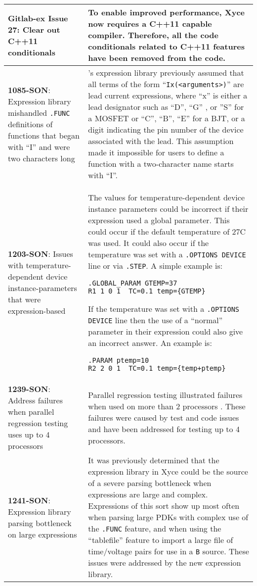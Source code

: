 {\begin{longtable}[h] {>{\raggedright\small}m{2in}|>{\raggedright\let\\\tabularnewline\small}m{3.5in}}
\textbf{Gitlab-ex Issue 27}:  Clear out C++11 conditionals&
To enable improved performance, Xyce now requires a C++11 capable compiler.
Therefore, all the code conditionals related to C++11 features have been
removed from the code. 
\\ \hline

\textbf{1085-SON}: Expression library mishandled \texttt{.FUNC} 
definitions of functions that began with ``I'' and were two characters long &
\Xyce{}'s expression library previously assumed that all terms of the form
``\texttt{Ix(<arguments>)}'' are lead current expressions, where ``x'' is
either a lead designator such as ``D'', ``G'' , or ''S'' for a MOSFET
or ``C'', ``B'', ``E'' for a BJT, or a digit indicating the pin number
of the device associated with the lead.  This assumption made it
impossible for users to define a function with a two-character name
starts with ``I''.  
\\ \hline

\textbf{1203-SON}: Issues with temperature-dependent device
instance-parameters that were expression-based & The values for
temperature-dependent device instance parameters could be incorrect
if their expression used a global parameter. This could occur if the
default temperature of 27C was used.  It could also occur if the
temperature was set with a \texttt{.OPTIONS DEVICE} line or via
\texttt{.STEP}.  A simple example is:
\begin{verbatim}
.GLOBAL_PARAM GTEMP=37
R1 1 0 1  TC=0.1 temp={GTEMP}
\end{verbatim}
If the temperature was set with a \texttt{.OPTIONS DEVICE} line then
the use of a ``normal'' parameter in their expression could also give
an incorrect answer.  An example is:
\begin{verbatim}
.PARAM ptemp=10
R2 2 0 1  TC=0.1 temp={temp+ptemp}
\end{verbatim}
\\ \hline

\textbf{1239-SON}: Address failures when parallel regression testing uses up to 4 processors &
Parallel regression testing illustrated failures when used on more than 2 processors
. These failures were caused by test and code issues and have been addressed for testing up to 4 processors.
\\ \hline

\textbf{1241-SON}: Expression library parsing bottleneck on large expressions &
It was previously determined that the expression library in Xyce could be the
source of a severe parsing bottleneck when expressions are large and
complex.  Expressions of this sort show up most often when parsing
large PDKs with complex use of the \texttt{.FUNC} feature, and when
using the ``tablefile'' feature to import a large file of time/voltage
pairs for use in a \texttt{B} source.  These issues were addressed by the new expression library.
\\ \hline


\end{longtable}}
